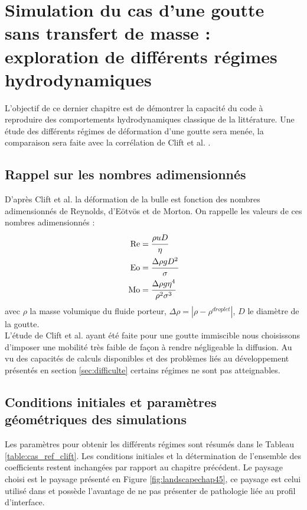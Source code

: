 \chapter{Simulation du cas d'une goutte sans transfert de masse : exploration de différents régimes hydrodynamiques}
L'objectif de ce dernier chapitre est de démontrer la capacité du code à reproduire des comportements hydrodynamiques classique de la littérature. Une étude des différents régimes de déformation d'une goutte sera menée, la comparaison sera faite avec la corrélation de Clift et al. \cite{clift_bubbles_2005}.
\section{Rappel sur les nombres adimensionnés}
D'après Clift et al. \cite{clift_bubbles_2005} la déformation de la bulle est fonction des nombres adimensionnés de Reynolds, d'Eötvös et de Morton. On rappelle les valeurs de ces nombres adimensionnés : 
\begin{align}
\text{Re} &= \cfrac{\rho u D}{\eta}\\
\text{Eo} &= \cfrac{\Delta \rho g D^2}{\sigma}\\
\text{Mo} &= \cfrac{\Delta \rho g \eta^4}{\rho^2 \sigma^3}
\end{align}
avec $\rho$ la masse volumique du fluide porteur, $\Delta\rho = |\rho - \rho^{droplet}|$, $D$ le diamètre de la goutte. \\
L'étude de Clift et al. ayant été faite pour une goutte immiscible nous choisissons d'imposer une mobilité très faible de façon à rendre négligeable la diffusion.
Au vu des capacités de calculs disponibles et des problèmes liés au développement présentés en section \ref{sec:difficulte} certains régimes ne sont pas atteignables.

\section{Conditions initiales et paramètres géométriques des simulations}
Les paramètres pour obtenir les différents régimes sont résumés dans le Tableau \ref{table:cas_ref_clift}. Les conditions initiales et la détermination de l'ensemble des coefficients restent inchangées par rapport au chapitre précédent. Le paysage choisi est le paysage présenté en Figure \ref{fig:landscapechap45}, ce paysage est celui utilisé dans \cite{rasolofomanana_numerical_nodate} et possède l'avantage de ne pas présenter de pathologie liée au profil d'interface.


